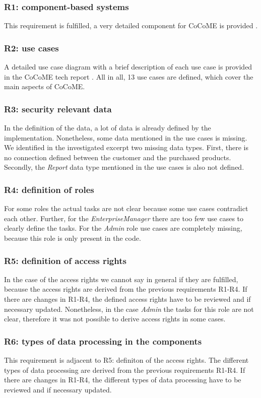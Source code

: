 \subsubsection{R1: component-based systems}
This requirement is fulfilled, a very detailed component for CoCoME is provided \cite{CoCoMETechReport}.
\subsubsection{R2: use cases}
A detailed use case diagram with a brief description of each use case is provided in the CoCoME tech report \cite{CoCoMETechReport}. All in all, 13 use cases are defined, which cover the main aspects of CoCoME.
\subsubsection{R3: security relevant data}
In the definition of the data, a lot of data is already defined by the implementation. Nonetheless, some data mentioned in the use cases is missing. We identified in the investigated excerpt two missing data types. First, there is no connection defined between the customer and the purchased products. Secondly, the \textit{Report} data type mentioned in the use cases is also not defined.
\subsubsection{R4: definition of roles}
For some roles the actual tasks are not clear because some use cases contradict each other. Further, for the \textit{EnterpriseManager} there are too few use cases to clearly define the tasks. For the \textit{Admin} role use cases are completely missing, because this role is only present in the code.
\subsubsection{R5: definition of access rights}
In the case of the access rights we cannot say in general if they are fulfilled, because the access rights are derived from the previous requirements R1-R4. If there are changes in R1-R4, the defined access rights have to be reviewed and if necessary updated. Nonetheless, in the case \textit{Admin} the tasks for this role are not clear, therefore it was not possible to derive access rights in some cases. 
\subsubsection{R6: types of data processing in the components}
This requirement is adjacent to R5: definiton of the access rights. The different types of data processing are derived from the previous requirements R1-R4. If there are changes in R1-R4, the different types of data processing have to be reviewed and if necessary updated.
